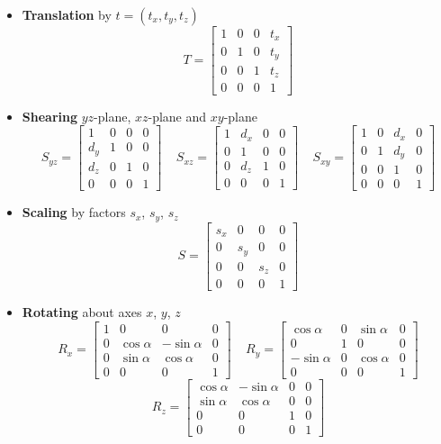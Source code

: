 \documentclass{article}
\begin{document}
\begin{itemize}
	\item \textbf{Translation} by $t = (t_x, t_y, t_z)$
	\[ T = \begin{bmatrix} 1 & 0 & 0 & t_x \\ 0 & 1 & 0 & t_y \\ 0 & 0 & 1 & t_z \\ 0 & 0 & 0 & 1 \end{bmatrix} \]
	
	\item \textbf{Shearing} $yz$-plane, $xz$-plane and $xy$-plane
	\[ S_{yz} = \begin{bmatrix} 1 & 0 & 0 & 0 \\ d_y & 1 & 0 & 0 \\ d_z & 0 & 1 & 0 \\ 0 & 0 & 0 & 1 \end{bmatrix} ~~~~~ S_{xz} = \begin{bmatrix} 1 & d_x & 0 & 0 \\ 0 & 1 & 0 & 0 \\ 0 & d_z & 1 & 0 \\ 0 & 0 & 0 & 1 \end{bmatrix} ~~~~~ S_{xy} = \begin{bmatrix} 1 & 0 & d_x & 0 \\ 0 & 1 & d_y & 0 \\ 0 & 0 & 1 & 0 \\ 0 & 0 & 0 & 1 \end{bmatrix} \]
	
	\item \textbf{Scaling} by factors $s_x$, $s_y$, $s_z$
	\[ S = \begin{bmatrix} s_x & 0 & 0 & 0 \\ 0 & s_y & 0 & 0 \\ 0 & 0 & s_z & 0 \\ 0 & 0 & 0 & 1 \end{bmatrix} \]
	
	\item \textbf{Rotating} about axes $x$, $y$, $z$
	\[ R_x = \begin{bmatrix} 1 & 0 & 0 & 0 \\ 0 & \cos \alpha & -\sin \alpha & 0 \\ 0 & \sin \alpha & \cos \alpha & 0 \\ 0 & 0 & 0 & 1 \end{bmatrix} ~~~~~ R_y = \begin{bmatrix} \cos \alpha & 0 & \sin \alpha & 0 \\ 0 & 1 & 0 & 0 \\ -\sin \alpha & 0 & \cos \alpha & 0 \\ 0 & 0 & 0 & 1 \end{bmatrix} \]
	\[ R_z = \begin{bmatrix} \cos \alpha & -\sin \alpha & 0 & 0 \\ \sin \alpha & \cos \alpha & 0 & 0 \\ 0 & 0 & 1 & 0 \\ 0 & 0 & 0 & 1 \end{bmatrix} \]
\end{itemize}
\end{document}
